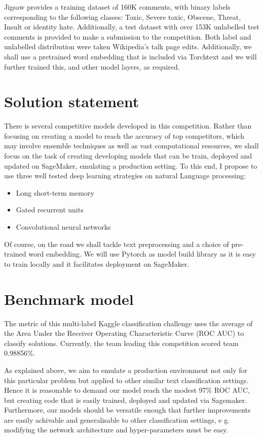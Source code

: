 \documentclass[book,preprintnumbers,11pt]{article}
\begin{document}
 Jigsaw provides a training dataset  of 160K comments, with binary labels
 corresponding to the following classes:
 Toxic, Severe toxic, Obscene, Threat, Insult or  identity hate.
 Additionally, a test dataset  with over 153K unlabelled  test comments is provided to make 
 a submission to the competition.
 Both label and unlabelled distribution were taken Wikipedia's talk page edits. Additionally, 
 we shall use a pretrained word embedding that is included via Torchtext and we will further
trained  this, and other model layers,   as required. 
 

\section{Solution statement}

There is several competitive models developed in this competition. Rather than focusing 
on creating a model to reach the accuracy of top competitors, which may involve ensemble 
techniques as well as vast computational  resources, we shall focus on the task 
of creating developing models that can be train, deployed and updated on SageMaker,
emulating a production setting. To this end, 
I propose to use three well tested deep learning strategies on natural Language processing:

\begin{itemize}
\item Long short-term memory
\item Gated recurrent units
\item Convolutional neural networks
\end{itemize}
 
Of course, on the road we shall tackle text preprocessing and a choice of
pre-trained word embedding. We will use Pytorch as model build library as 
it is easy to train locally and it facilitates deployment on SageMaker.
 
\section{Benchmark model}

The metric of this multi-label Kaggle classification challenge 
uses the average of the  Area Under the Receiver Operating Characteristic Curve (ROC AUC) to 
 classify solutions. Currently, the team leading this competition scored team 0.98856\%.

As explained above, we aim to emulate a production 
environment not only for this particular problem but applied to other similar text
classification settings. Hence it is reasonable to demand our model reach the modest 97\% ROC AUC, 
but creating code that is easily trained, deployed and updated via Sagemaker. Furthermore, our 
models should be versatile enough that further improvements are easily achivable and 
generalisable to other classification settings, e g. modifying the network architecture and hyper-parameters 
must be easy.
\end{document}
